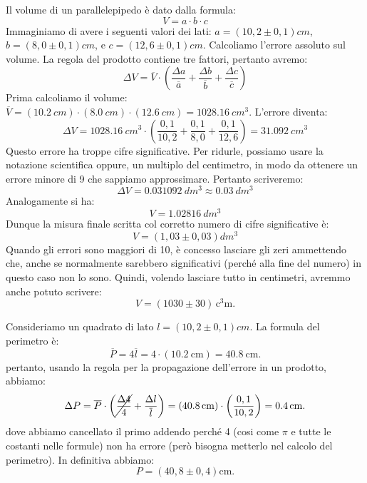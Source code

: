 \documentclass[12pt,a4paper,oneside]{book}
\newcounter{testexample} %
\theoremstyle{esercizio}
\begin{document}
\begin{testexample}
Il volume di un parallelepipedo è dato dalla formula:
\[
V=a \cdot b \cdot c
\]
Immaginiamo di avere i seguenti valori dei lati: $a=\left(10,2 \pm 0,1\right)\si{cm}$, $b=\left(8,0 \pm 0,1\right)\si{cm}$, e $c=\left(12,6 \pm 0,1\right)\si{cm}$.
Calcoliamo l'errore assoluto sul volume. La regola del prodotto contiene tre fattori, pertanto avremo:
\[
\Delta V=\overline{V} \cdot \left( \frac{\Delta a}{\overline{a}}+\frac{\Delta b}{\overline{b}} +\frac{\Delta c}{\overline{c}}\right)
\]
Prima calcoliamo il volume: $\overline{V}=\left(\SI{10,2}{cm}\right)\cdot \left(\SI{8,0}{cm}\right)\cdot \left(\SI{12,6}{cm}\right)=\SI{1028,16}{cm^3}$.
L'errore diventa:
\[
\Delta V=\SI{1028,16}{cm^3} \cdot \left( \frac{0,1}{10,2}+\frac{0,1}{8,0} +\frac{0,1}{12,6}\right)=\SI{31,092}{cm^3}
\]
Questo errore ha troppe cifre significative. Per ridurle, possiamo usare la notazione scientifica oppure, un multiplo del centimetro, in modo da ottenere un errore minore di 9 che sappiamo approssimare. Pertanto scriveremo:
\[
\Delta V = \SI{0,031092}{dm^3}\approx \SI{0,03}{dm^3}
\]
Analogamente si ha:
\[
V=\SI{1,02816}{dm^3} 
\]
Dunque la misura finale scritta col corretto numero di cifre significative è:
\[
V=\left(1,03 \pm 0,03\right)\si{dm^3}
\]
Quando gli errori sono maggiori di 10, è concesso lasciare gli zeri ammettendo che, anche se normalmente sarebbero significativi (perché alla fine del numero) in questo caso non lo sono. Quindi, volendo lasciare tutto in centimetri, avremmo anche potuto scrivere:
\[
V=\left(1030 \pm 30\right)\,\si{\cubic\centi\meter}.
\]
\end{testexample}
\begin{testexample}
Consideriamo un quadrato di lato  $l=\left(10,2 \pm 0,1\right)\si{cm}$. La formula del perimetro è:
\[
\overline{P}=4\overline{l} = 4\cdot \left(\SI{10,2}{\centi\meter} \right) =\SI{40,8}{\centi\meter}.
\]
pertanto, usando la regola per la propagazione dell'errore in un prodotto, abbiamo:
\[
\Delta P= \overline{P}\cdot\left( \cancel{\frac{\Delta 4}{4}} +\frac{\Delta l}{\overline{l}}  \right) = \left(\SI{40,8}{\centi\meter}\right)\cdot \left(\frac{0,1}{10,2} \right) =\SI{0,4}{\centi\meter} .
\]
dove abbiamo cancellato il primo addendo perché 4 (cosi come $\pi$ e tutte le costanti nelle formule) non ha errore (però bisogna metterlo nel calcolo del perimetro). In definitiva abbiamo:
\[
P=\left(40,8 \pm 0,4\right) \si{\centi\meter}.
\]
\end{testexample}
\end{document}
